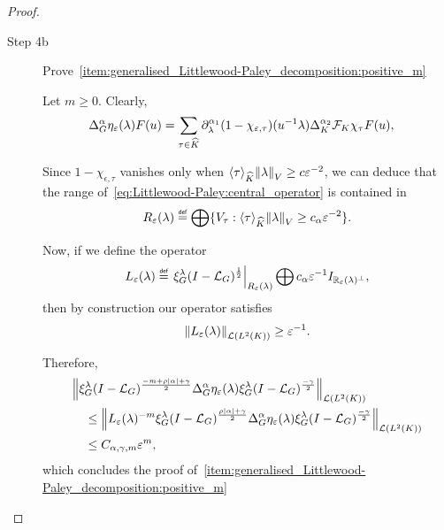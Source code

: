 \begin{proof}
\begin{description}
        \item [Step 4b] Prove~\ref{item:generalised_Littlewood-Paley_decomposition:positive_m}

            Let $m \geq 0$.
            Clearly,
            \begin{align*}
                \DifferenceOperatorOrder \alpha \eta_\epsilon(\lambda) F(u)
                &= \sum_{\tau \in \dualGroup \CompactGroup}
                \iD {\lambda^{\alpha_1} } (1 - \chi_{\epsilon, \tau})(u^{-1} \lambda)
                \DifferenceOperatorOrder [\CompactGroup] {\alpha_2} \Fourier [\CompactGroup] \chi_\tau F(u),
            \end{align*}

            Since $1 - \chi_{\epsilon, \tau}$ vanishes only when $\JapaneseBracket \CompactGroup \tau \norm \lambda \geq c \epsilon^{-2}$,
            we can deduce that the range of~\eqref{eq:Littlewood-Paley:central_operator} is contained in
            \begin{align*}
                R_\epsilon(\lambda) \defeq \bigoplus \{V_\tau : \JapaneseBracket \CompactGroup \tau \norm \lambda \geq c_\alpha \epsilon^{-2} \}.
            \end{align*}

            Now, if we define the operator
            \begin{align*}
                L_\epsilon(\lambda) \defeq \eval {\Rep \lambda \BesselPotential 1} {R_\epsilon(\lambda)} \bigoplus c_\alpha \epsilon^{-1} \Id {\R_\epsilon(\lambda)^\perp},
            \end{align*}
            then by construction our operator satisfies
            \begin{align*}
                \norm [\Lin {\Lebesgue 2 \CompactGroup}] {L_\epsilon(\lambda)} \geq \epsilon^{-1}.
            \end{align*}

            Therefore,
            \begin{align*}
                &\norm [\Lin {\Lebesgue 2 \CompactGroup}] {%
                    \Rep \lambda \BesselPotential {-m + \rho \abs\alpha + \gamma}
                    \DifferenceOperatorOrder \alpha \eta_\epsilon(\lambda)
                    \Rep \lambda \BesselPotential {-\gamma}
                }\\
                &\quad \leq \norm [\Lin {\Lebesgue 2 \CompactGroup}] {%
                    L_\epsilon(\lambda)^{-m}
                    \Rep \lambda \BesselPotential {\rho \abs \alpha + \gamma}
                    \DifferenceOperatorOrder \alpha \eta_\epsilon(\lambda)
                    \Rep \lambda \BesselPotential {-\gamma}
                }\\
                &\quad \leq C_{\alpha, \gamma, m} \epsilon^{m},
            \end{align*}
            which concludes the proof of~\ref{item:generalised_Littlewood-Paley_decomposition:positive_m}
    \end{description}
\end{proof}

